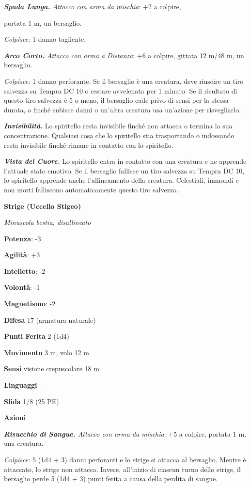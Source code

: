 \begin{multicols}{2}
\emph{\textbf{Spada Lunga.} Attacco con arma da mischia}: +2 a colpire,

portata 1 m, un bersaglio.

\emph{Colpisce:} 1 danno tagliente.

\emph{\textbf{Arco Corto.} Attacco con arma a Distanza}: +6 a colpire,
gittata 12 m/48 m, un bersaglio.

\emph{Colpisce:} 1 danno perforante. Se il bersaglio è una creatura,
deve riuscire un tiro salvezza su Tempra DC 10 o restare
avvelenata per 1 minuto. Se il risultato di questo tiro salvezza è 5 o
meno, il bersaglio cade privo di sensi per la stessa durata, o finché
subisce danni o un'altra creatura usa un'azione per risvegliarlo.

\emph{\textbf{Invisibilità.}} Lo spiritello resta invisibile finché non
attacca o termina la sua concentrazione. Qualsiasi cosa che lo
spiritello stia trasportando o indossando resta invisibile finché rimane
in contatto con lo spiritello.

\emph{\textbf{Vista del Cuore.}} Lo spiritello entra in contatto con una
creatura e ne apprende l'attuale stato emotivo. Se il bersaglio fallisce
un tiro salvezza su Tempra DC 10, lo spiritello apprende anche
l'allineamento della creatura. Celestiali, immondi e non morti
falliscono automaticamente questo tiro salvezza.



\textbf{Strige (Uccello Stigeo)}

\emph{Minuscola bestia, disallineato}

\textbf{Potenza}: -3

\textbf{Agilità}: +3

\textbf{Intelletto}: -2

\textbf{Volontà}: -1

\textbf{Magnetismo}: -2

\textbf{Difesa} 17 (armatura naturale)

\textbf{Punti Ferita} 2 (1d4)

\textbf{Movimento} 3 m, volo 12 m

\textbf{Sensi} visione crepuscolare 18 m

\textbf{Linguaggi} -

\textbf{Sfida} 1/8 (25 PE)\smallskip

\smallskip\textbf{Azioni}

\emph{\textbf{Risucchio di Sangue.} Attacco con arma da mischia}: +5 a
colpire, portata 1 m, una creatura.

\emph{Colpisce:} 5 (1d4 + 3) danni perforanti e lo strige si attacca al
bersaglio. Mentre è attaccato, lo strige non attacca. Invece, all'inizio
di ciascun turno dello strige, il bersaglio perde 5 (1d4 + 3) punti
ferita a causa della perdita di sangue.


\end{multicols}
